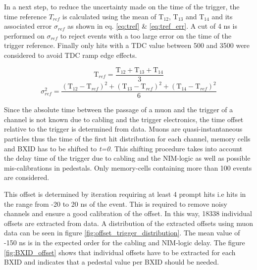 In a next step, to reduce the uncertainty made on the time of the trigger, the time reference $T_{ref}$ is calculated using the mean of T$_{12}$, T$_{13}$ and T$_{14}$ and its associated error $\sigma_{ref}$ as shown in eq. \ref{eq:tref} \& \ref{eq:tref_err}. A cut of 4 ns is performed on $\sigma_{ref}$ to reject events with a too large error on the time of the trigger reference. Finally only hits with a TDC value between 500 and 3500 were considered to avoid TDC ramp edge effects.

\begin{equation} \label{eq:tref}
	\text{T}_{ref} = \frac{\text{T}_{12} + \text{T}_{13} + \text{T}_{14}}{3}
\end{equation}
\begin{equation} \label{eq:tref_err}
	\sigma_{ref}^2 = \frac{ (\text{T}_{12} - \text{T}_{ref})^2 + (\text{T}_{13} - \text{T}_{ref})^2  + (\text{T}_{14} - \text{T}_{ref})^2 }{6}
\end{equation}

Since the absolute time between the passage of a muon and the trigger of a channel is not known due to cabling and the trigger electronics, the time offset relative to the trigger is determined from data. Muons are quasi-instantaneous particles thus the time of the first hit distribution for each channel, memory cells and BXID has to be shifted to \textit{t=0}. This shifting procedure takes into account the delay time of the trigger due to cabling and the NIM-logic as well as possible mis-calibrations in pedestals. Only memory-cells containing more than 100 events are considered.

This offset is determined by iteration requiring at least 4 prompt hits i.e hits in the range from -20 to 20 ns of the event. This is required to remove noisy channels and ensure a good calibration of the offset. In this way, 18338 individual offsets are extracted from data. A distribution of the extracted offsets using muon data can be seen in figure \ref{fig:offset_trigger_distribution}. The mean value of -150 ns is in the expected order for the cabling and NIM-logic delay. The figure \ref{fig:BXID_offset} shows that individual offsets have to be extracted for each BXID and indicates that a pedestal value per BXID should be needed.

